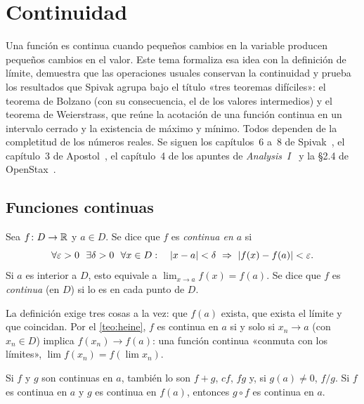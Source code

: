 \chapter{Continuidad}
\label{tema:3}

Una función es continua cuando pequeños cambios en la variable producen pequeños cambios en el valor. Este tema formaliza esa idea con la definición de límite, demuestra que las operaciones usuales conservan la continuidad y prueba los resultados que Spivak agrupa bajo el título «tres teoremas difíciles»: el teorema de Bolzano (con su consecuencia, el de los valores intermedios) y el teorema de Weierstrass, que reúne la acotación de una función continua en un intervalo cerrado y la existencia de máximo y mínimo. Todos dependen de la completitud de los números reales. Se siguen los capítulos~6 a~8 de Spivak~\cite{spivak}, el capítulo~3 de Apostol~\cite{apostol}, el capítulo~4 de los apuntes de \emph{Analysis~I}~\cite{cambA1} y la §2.4 de OpenStax~\cite{osc1}.

\section{Funciones continuas}

\begin{definicion}[Continuidad]\label{def:continuidad}
Sea $f\colon D\to\mathbb{R}$ y $a\in D$. Se dice que $f$ es \emph{continua en $a$} si
\[
\forall\varepsilon>0\ \ \exists\delta>0\ \ \forall x\in D:\quad \abs{x-a}<\delta\ \Rightarrow\ \abs{f(x)-f(a)}<\varepsilon.
\]
Si $a$ es interior a $D$, esto equivale a $\lim_{x\to a}f(x)=f(a)$. Se dice que $f$ es \emph{continua} (en $D$) si lo es en cada punto de $D$.
\end{definicion}

La definición exige tres cosas a la vez: que $f(a)$ exista, que exista el límite y que coincidan. Por el \cref{teo:heine}, $f$ es continua en $a$ si y solo si $x_n\to a$ (con $x_n\in D$) implica $f(x_n)\to f(a)$: una función continua «conmuta con los límites», $\lim f(x_n)=f(\lim x_n)$.

\begin{proposicion}\label{prop:operaciones-continuas}
Si $f$ y $g$ son continuas en $a$, también lo son $f+g$, $cf$, $fg$ y, si $g(a)\ne0$, $f/g$. Si $f$ es continua en $a$ y $g$ es continua en $f(a)$, entonces $g\circ f$ es continua en $a$.
\end{proposicion}

